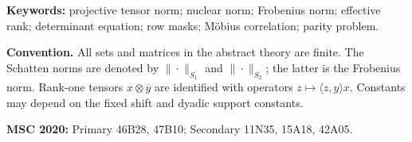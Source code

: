 \documentclass[11pt]{article}
\theoremstyle{definition}
\theoremstyle{remark}
\begin{document}
\noindent\textbf{Keywords:} projective tensor norm; nuclear norm;
Frobenius norm; effective rank; determinant equation; row masks;
M\"obius correlation; parity problem.

\medskip
\noindent\textbf{Convention.}
All sets and matrices in the abstract theory are finite.  The Schatten
norms are denoted by \(\|\cdot\|_{S_1}\) and
\(\|\cdot\|_{S_2}\); the latter is the Frobenius norm.  Rank-one
tensors \(x\otimes\overline y\) are identified with operators
\(z\mapsto\langle z,y\rangle x\).  Constants may depend on the fixed
shift and dyadic support constants.

\medskip
\noindent\textbf{MSC 2020:} Primary 46B28, 47B10; Secondary 11N35,
15A18, 42A05.











\begingroup
\small
\raggedright
\setlength{\bibsep}{4pt plus 1pt minus 1pt}


\endgroup
\end{document}
